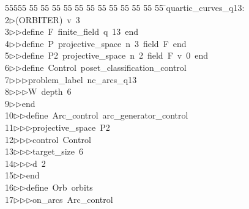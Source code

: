 %
%
\begin{tabbing}
55555 \= 55 \= 55 \= 55 \= 55 \= 55 \= 55 \= 55 \= 55 \= 55 \= 55 \= 55 \= 55 \= \>quartic\_curves\_q13:\\[0pt]
2\>$\triangleright$\>(ORBITER)\ v\ 3\ \\[0pt]
3\>$\triangleright$\>$\triangleright$\>define\ F\ finite\_field\ q\ 13\ end\ \\[0pt]
4\>$\triangleright$\>$\triangleright$\>define\ P\ projective\_space\ n\ 3\ field\ F\ end\ \\[0pt]
5\>$\triangleright$\>$\triangleright$\>define\ P2\ projective\_space\ n\ 2\ field\ F\ v\ 0\ end\ \\[0pt]
6\>$\triangleright$\>$\triangleright$\>define\ Control\ poset\_classification\_control\ \\[0pt]
7\>$\triangleright$\>$\triangleright$\>$\triangleright$\>problem\_label\ nc\_arcs\_q13\ \\[0pt]
8\>$\triangleright$\>$\triangleright$\>$\triangleright$\>W\ depth\ 6\ \\[0pt]
9\>$\triangleright$\>$\triangleright$\>end\ \\[0pt]
10\>$\triangleright$\>$\triangleright$\>define\ Arc\_control\ arc\_generator\_control\ \\[0pt]
11\>$\triangleright$\>$\triangleright$\>$\triangleright$\>projective\_space\ P2\ \\[0pt]
12\>$\triangleright$\>$\triangleright$\>$\triangleright$\>control\ Control\ \\[0pt]
13\>$\triangleright$\>$\triangleright$\>$\triangleright$\>target\_size\ 6\ \\[0pt]
14\>$\triangleright$\>$\triangleright$\>$\triangleright$\>d\ 2\ \\[0pt]
15\>$\triangleright$\>$\triangleright$\>end\ \\[0pt]
16\>$\triangleright$\>$\triangleright$\>define\ Orb\ orbits\ \\[0pt]
17\>$\triangleright$\>$\triangleright$\>$\triangleright$\>on\_arcs\ Arc\_control\ \\[0pt]

\end{tabbing}
